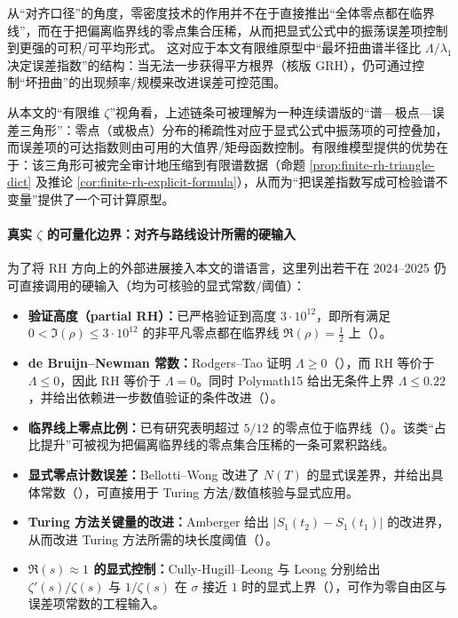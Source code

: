 从“对齐口径”的角度，零密度技术的作用并不在于直接推出“全体零点都在临界线”，而在于把偏离临界线的零点集合压稀，从而把显式公式中的振荡误差项控制到更强的可积/可平均形式。
这对应于本文有限维原型中“最坏扭曲谱半径比 $\Lambda/\lambda_1$ 决定误差指数”的结构：当无法一步获得平方根界（核版 GRH），仍可通过控制“坏扭曲”的出现频率/规模来改进误差可控范围。

从本文的“有限维 \(\zeta\)”视角看，上述链条可被理解为一种连续谱版的“谱—极点—误差三角形”：零点（或极点）分布的稀疏性对应于显式公式中振荡项的可控叠加，而误差项的可达指数则由可用的大值界/矩母函数控制。有限维模型提供的优势在于：该三角形可被完全审计地压缩到有限谱数据（命题 \ref{prop:finite-rh-triangle-dict} 及推论 \ref{cor:finite-rh-explicit-formula}），从而为“把误差指数写成可检验谱不变量”提供了一个可计算原型。

\paragraph{真实 \texorpdfstring{$\zeta$}{zeta} 的可量化边界：对齐与路线设计所需的硬输入}
为了将 RH 方向上的外部进展接入本文的谱语言，这里列出若干在 2024--2025 仍可直接调用的硬输入（均为可核验的显式常数/阈值）：
\begin{itemize}
  \item \textbf{验证高度（partial RH）：}已严格验证到高度 \(3\cdot 10^{12}\)，即所有满足 \(0<\Im(\rho)\le 3\cdot 10^{12}\) 的非平凡零点都在临界线 \(\Re(\rho)=\tfrac12\) 上（\cite{PlattTrudgian2020RH3e12}）。
  \item \textbf{de Bruijn--Newman 常数：}Rodgers--Tao 证明 \(\Lambda\ge 0\)（\cite{RodgersTao2018NewmanNonnegative}），而 RH 等价于 \(\Lambda\le 0\)，因此 RH 等价于 \(\Lambda=0\)。同时 Polymath15 给出无条件上界 \(\Lambda\le 0.22\)，并给出依赖进一步数值验证的条件改进（\cite{Polymath2019NewmanUpper}）。
  \item \textbf{临界线上零点比例：}已有研究表明超过 \(5/12\) 的零点位于临界线（\cite{PrattRoblesZaharescuZeindler2018FiveTwelfths}）。该类“占比提升”可被视为把偏离临界线的零点集合压稀的一条可累积路线。
  \item \textbf{显式零点计数误差：}Bellotti--Wong 改进了 \(N(T)\) 的显式误差界，并给出具体常数（\cite{BellottiWong2024ImprovedNT}），可直接用于 Turing 方法/数值核验与显式应用。
  \item \textbf{Turing 方法关键量的改进：}Amberger 给出 \(|S_1(t_2)-S_1(t_1)|\) 的改进界，从而改进 Turing 方法所需的块长度阈值（\cite{Amberger2025S1}）。
  \item \textbf{\(\Re(s)\approx 1\) 的显式控制：}Cully-Hugill--Leong 与 Leong 分别给出 \(\zeta'(s)/\zeta(s)\) 与 \(1/\zeta(s)\) 在 \(\sigma\) 接近 \(1\) 时的显式上界（\cite{CullyHugillLeong2023Zeta1Line,Leong2024LogDerivRecip}），可作为零自由区与误差项常数的工程输入。
\end{itemize}

